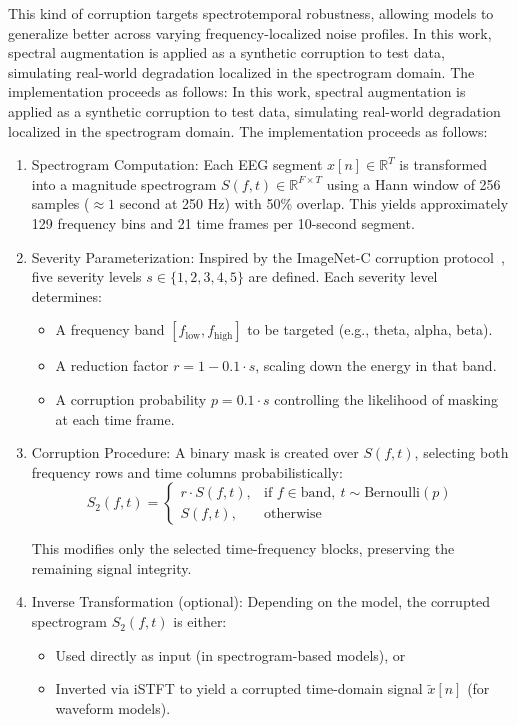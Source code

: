 This kind of corruption targets spectrotemporal robustness, allowing models to generalize better across varying frequency-localized noise profiles. In this work, spectral augmentation is applied as a synthetic corruption to test data, simulating real-world degradation localized in the spectrogram domain. The implementation proceeds as follows:
In this work, spectral augmentation is applied as a synthetic corruption to test data, simulating real-world degradation localized in the spectrogram domain. The implementation proceeds as follows:

\begin{enumerate}
    \item Spectrogram Computation: Each EEG segment \( x[n] \in \mathbb{R}^T \) is transformed into a magnitude spectrogram \( S(f, t) \in \mathbb{R}^{F \times T} \) using a Hann window of 256 samples (\( \approx 1 \) second at 250 Hz) with 50\% overlap. This yields approximately 129 frequency bins and 21 time frames per 10-second segment.

    \item Severity Parameterization: Inspired by the ImageNet-C corruption protocol~\cite{benchmarkingneuralnetworkrobustness}, five severity levels \( s \in \{1, 2, 3, 4, 5\} \) are defined. Each severity level determines:
    \begin{itemize}
        \item A frequency band \( [f_{\text{low}}, f_{\text{high}}] \) to be targeted (e.g., theta, alpha, beta).
        \item A reduction factor \( r = 1 - 0.1 \cdot s \), scaling down the energy in that band.
        \item A corruption probability \( p = 0.1 \cdot s \) controlling the likelihood of masking at each time frame.
    \end{itemize}

    \item Corruption Procedure: A binary mask is created over \( S(f, t) \), selecting both frequency rows and time columns probabilistically:
    \begin{equation}
    S_2(f, t) =
    \begin{cases}
        r \cdot S(f, t), & \text{if } f \in \text{band},\ t \sim \text{Bernoulli}(p) \\
        S(f, t), & \text{otherwise}
    \end{cases}
    \end{equation}

    This modifies only the selected time-frequency blocks, preserving the remaining signal integrity.

    \item Inverse Transformation (optional): Depending on the model, the corrupted spectrogram \( S_2(f, t) \) is either:
    \begin{itemize}
        \item Used directly as input (in spectrogram-based models), or
        \item Inverted via iSTFT to yield a corrupted time-domain signal \( \tilde{x}[n] \) (for waveform models).
    \end{itemize}
\end{enumerate}


